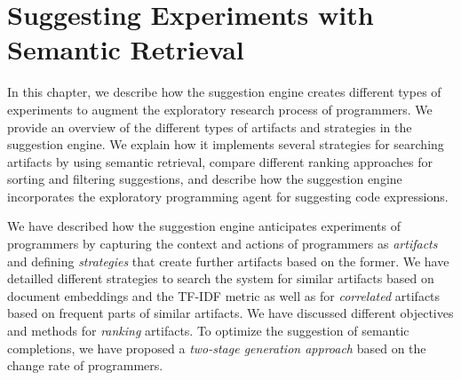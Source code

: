 
\chapter{Suggesting Experiments with Semantic Retrieval}
\label{cha:suggestions}

In this chapter, we describe how the suggestion engine creates different types of experiments to augment the exploratory research process of programmers.
We provide an overview of the different types of artifacts and strategies in the suggestion engine.
We explain how it implements several strategies for searching artifacts by using semantic retrieval, compare different ranking approaches for sorting and filtering suggestions, and describe how the suggestion engine incorporates the exploratory programming agent for suggesting code expressions.


\begin{summary}
	We have described how the suggestion engine anticipates experiments of programmers by capturing the context and actions of programmers as \emph{artifacts} and defining \emph{strategies} that create further artifacts based on the former.
	We have detailled different strategies to search the system for similar artifacts based on document embeddings and the TF-IDF metric as well as for \emph{correlated} artifacts based on frequent parts of similar artifacts.
	We have discussed different objectives and methods for \emph{ranking} artifacts.
	To optimize the suggestion of semantic completions, we have proposed a \emph{two-stage generation approach} based on the change rate of programmers.
\end{summary}

